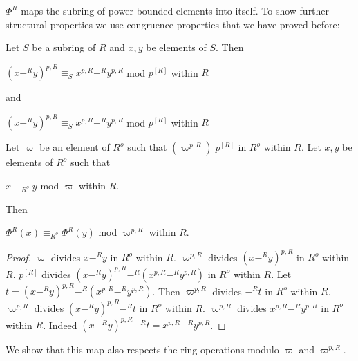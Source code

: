 \documentclass[english,11pt]{article}
\begin{document}
$\Phi^{R}$ maps the subring of power-bounded elements into itself.
To show further structural properties we use congruence properties that
we have proved before:

\begin{lemma*}
Let $S$ be a subring of $R$ and $x,y$ be elements of $S$.
Then 

$(x +^{R} y)^{p,R} \equiv_{S} 
x^{p,R} +^{R} y^{p,R}$ mod $p^{[R]}$ within $R$ 

and

$(x -^{R} y)^{p,R} \equiv_{S} 
x^{p,R} -^{R} y^{p,R}$ mod $p^{[R]}$ within $R$ 
\end{lemma*}

\begin{forthel}

\begin{lemma}Let $\varpi$ be an element of $R^o$ such that
$(\varpi^{p,R}) | p^{[R]}$ in $R^o$ within $R$.
Let $x,y$ be elements of $R^o$ such that

$x \equiv_{R^o} y$ mod $\varpi$ within $R$.

Then 

$\Phi^{R}(x) \equiv_{R^o} \Phi^{R}(y)$ mod $\varpi^{p,R}$ within $R$.
\end{lemma}
\begin{proof}
$\varpi$ divides $x -^{R} y$ in $R^o$ within $R$.
$\varpi^{p,R}$ divides $(x -^{R} y)^{p,R}$ in $R^o$ within $R$.
$p^{[R]}$ divides $(x -^{R} y)^{p,R} -^{R} (x^{p,R} -^{R} y^{p,R})$ in $R^o$ within $R$.
Let $t = (x -^{R} y)^{p,R} -^{R} (x^{p,R} -^{R} y^{p,R})$.
Then $\varpi^{p,R}$ divides $-^{R} t$ in $R^o$ within $R$.
$\varpi^{p,R}$ divides $(x -^{R} y)^{p,R} -^{R} t$ in $R^o$ within $R$.
$\varpi^{p,R}$ divides $x^{p,R} -^{R} y^{p,R}$ in $R^o$ within $R$.
Indeed $(x -^{R} y)^{p,R} -^{R} t = x^{p,R} -^{R} y^{p,R}$.
\end{proof}

\end{forthel}

We show that this map also respects the ring operations modulo 
$\varpi$ and $\varpi^{p,R}$.
\end{document}
